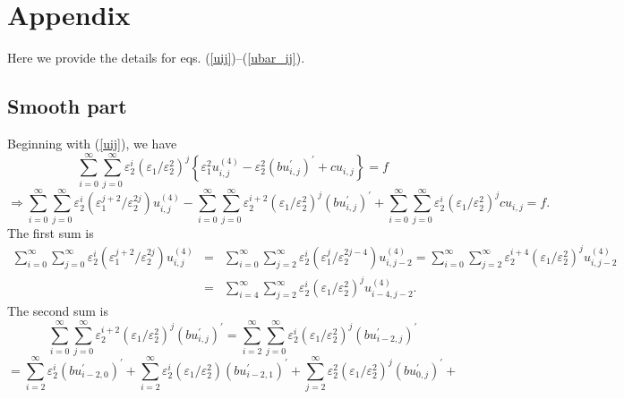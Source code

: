 \documentclass[12pt]{article}
\begin{document}
\section{Appendix}

Here we provide the details for eqs. (\ref{uij})--(\ref{ubar_ij}).

\subsection{Smooth part}

Beginning with (\ref{uij}), we have 
\begin{equation*}
\sum_{i=0}^{\infty }\sum_{j=0}^{\infty }\varepsilon _{2}^{i}(\varepsilon
_{1}/\varepsilon _{2}^{2})^{j}\left\{ \varepsilon
_{1}^{2}u_{i,j}^{(4)}-\varepsilon _{2}^{2}\left( bu_{i,j}^{\prime }\right)
^{\prime }+cu_{i,j}\right\} =f
\end{equation*}%
\begin{equation*}
\Rightarrow \sum_{i=0}^{\infty }\sum_{j=0}^{\infty }\varepsilon
_{2}^{i}(\varepsilon _{1}^{j+2}/\varepsilon
_{2}^{2j})u_{i,j}^{(4)}-\sum_{i=0}^{\infty }\sum_{j=0}^{\infty }\varepsilon
_{2}^{i+2}(\varepsilon _{1}/\varepsilon _{2}^{2})^{j}\left( bu_{i,j}^{\prime
}\right) ^{\prime }+\sum_{i=0}^{\infty }\sum_{j=0}^{\infty }\varepsilon
_{2}^{i}(\varepsilon _{1}/\varepsilon _{2}^{2})^{j}cu_{i,j}=f.
\end{equation*}%
The first sum is%
\begin{eqnarray*}
\sum_{i=0}^{\infty }\sum_{j=0}^{\infty }\varepsilon _{2}^{i}(\varepsilon
_{1}^{j+2}/\varepsilon _{2}^{2j})u_{i,j}^{(4)} &=&\sum_{i=0}^{\infty
}\sum_{j=2}^{\infty }\varepsilon _{2}^{i}(\varepsilon _{1}^{j}/\varepsilon
_{2}^{2j-4})u_{i,j-2}^{(4)}=\sum_{i=0}^{\infty }\sum_{j=2}^{\infty
}\varepsilon _{2}^{i+4}(\varepsilon _{1}/\varepsilon
_{2}^{2})^{j}u_{i,j-2}^{(4)} \\
&=&\sum_{i=4}^{\infty }\sum_{j=2}^{\infty }\varepsilon _{2}^{i}(\varepsilon
_{1}/\varepsilon _{2}^{2})^{j}u_{i-4,j-2}^{(4)}.
\end{eqnarray*}%
The second sum is%
\begin{equation*}
\sum_{i=0}^{\infty }\sum_{j=0}^{\infty }\varepsilon _{2}^{i+2}(\varepsilon
_{1}/\varepsilon _{2}^{2})^{j}\left( bu_{i,j}^{\prime }\right) ^{\prime
}=\sum_{i=2}^{\infty }\sum_{j=0}^{\infty }\varepsilon _{2}^{i}(\varepsilon
_{1}/\varepsilon _{2}^{2})^{j}\left( bu_{i-2,j}^{\prime }\right) ^{\prime }
\end{equation*}%
\begin{equation*}
=\sum_{i=2}^{\infty }\varepsilon _{2}^{i}\left( bu_{i-2,0}^{\prime
}\right) ^{\prime }+\sum_{i=2}^{\infty }\varepsilon _{2}^{i}(\varepsilon
_{1}/\varepsilon _{2}^{2})\left( bu_{i-2,1}^{\prime }\right) ^{\prime
}+\sum_{j=2}^{\infty }\varepsilon _{2}^{2}(\varepsilon _{1}/\varepsilon
_{2}^{2})^{j}\left( bu_{0,j}^{\prime }\right) ^{\prime }+
\end{equation*}%
\end{document}
